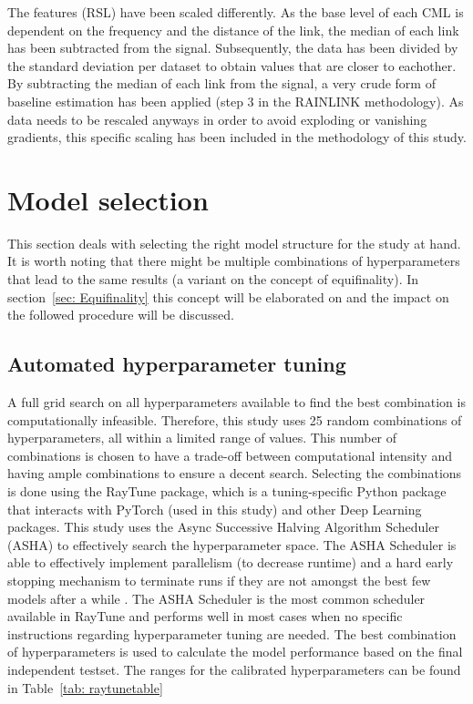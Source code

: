 \documentclass[twocolumn, 10pt, a4paper]{memoir}
\begin{document}
	The features (RSL) have been scaled differently. As the base level of each CML is dependent on the frequency and the distance of the link, the median of each link has been subtracted from the signal. Subsequently, the data has been divided by the standard deviation per dataset to obtain values that are closer to eachother. By subtracting the median of each link from the signal, a very crude form of baseline estimation has been applied (step 3 in the RAINLINK methodology). As data needs to be rescaled anyways in order to avoid exploding or vanishing gradients, this specific scaling has been included in the methodology of this study. 
	
	
	
	\section{Model selection} \label{sec: modelselection}
	This section deals with selecting the right model structure for the study at hand. It is worth noting that there might be multiple combinations of hyperparameters that lead to the same results (a variant on the concept of equifinality). In section~\ref{sec: Equifinality} this concept will be elaborated on and the impact on the followed procedure will be discussed.
	
	\subsection{Automated hyperparameter tuning} \label{sec: RayTune}
	A full grid search on all hyperparameters available to find the best combination is computationally infeasible. Therefore, this study uses 25 random combinations of hyperparameters, all within a limited range of values. This number of combinations is chosen to have a trade-off between computational intensity and having ample combinations to ensure a decent search.
	Selecting the combinations is done using the RayTune package, which is a tuning-specific Python package that interacts with PyTorch (used in this study) and other Deep Learning packages. This study uses the Async Successive Halving Algorithm Scheduler (ASHA) to effectively search the hyperparameter space. The ASHA Scheduler is able to effectively implement parallelism (to decrease runtime) and a hard early stopping mechanism to terminate runs if they are not amongst the best few models after a while \cite{Li2018}. The ASHA Scheduler is the most common scheduler available in RayTune and performs well in most cases when no specific instructions regarding hyperparameter tuning are needed.  
	The best combination of hyperparameters is used to calculate the model performance based on the final independent testset. The ranges for the calibrated hyperparameters can be found in Table~\ref{tab: raytunetable}
	
\end{document}
